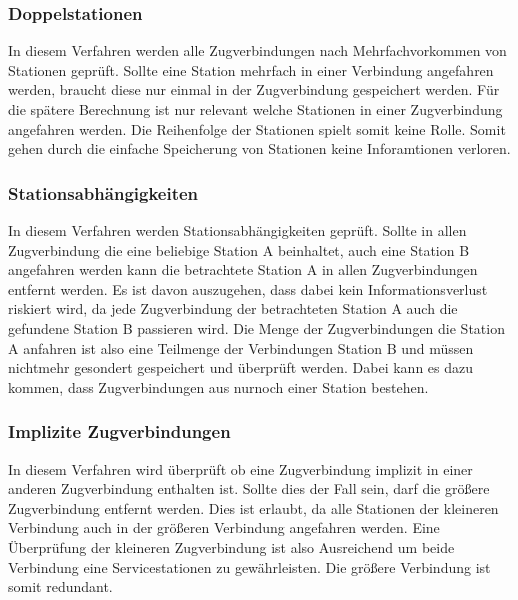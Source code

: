 \subsubsection{Doppelstationen}\label{subsubsec:doppelstationen}
In diesem Verfahren werden alle Zugverbindungen nach Mehrfachvorkommen von Stationen geprüft. Sollte eine Station mehrfach in einer Verbindung angefahren werden, braucht diese nur einmal in der Zugverbindung gespeichert werden. Für die spätere Berechnung ist nur relevant welche Stationen in einer Zugverbindung angefahren werden. Die Reihenfolge der Stationen spielt somit keine Rolle. Somit gehen durch die einfache Speicherung von Stationen keine Inforamtionen verloren.\\

\subsubsection{Stationsabhängigkeiten}
In diesem Verfahren werden Stationsabhängigkeiten geprüft. Sollte in allen Zugverbindung die eine beliebige Station A beinhaltet, auch eine Station B angefahren werden kann die betrachtete Station A in allen Zugverbindungen entfernt werden. Es ist davon auszugehen, dass dabei kein Informationsverlust riskiert wird, da jede Zugverbindung der betrachteten Station A auch die gefundene Station B passieren wird. Die Menge der Zugverbindungen die Station A anfahren ist also eine Teilmenge der Verbindungen Station B und müssen nichtmehr gesondert gespeichert und überprüft werden. Dabei kann es dazu kommen, dass Zugverbindungen aus nurnoch einer Station bestehen.\\

\subsubsection{Implizite Zugverbindungen}
In diesem Verfahren wird überprüft ob eine Zugverbindung implizit in einer anderen Zugverbindung enthalten ist. Sollte dies der Fall sein, darf die größere Zugverbindung entfernt werden. Dies ist erlaubt, da alle Stationen der kleineren Verbindung auch in der größeren Verbindung angefahren werden. Eine Überprüfung der kleineren Zugverbindung ist also Ausreichend um beide Verbindung eine Servicestationen zu gewährleisten. Die größere Verbindung ist somit redundant.\\

